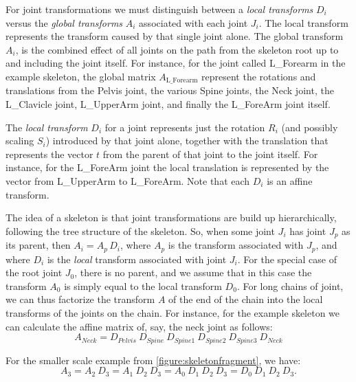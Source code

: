 For joint transformations we must distinguish between a \emph{local transforms} $D_i$ versus the \emph{global transforms} $A_i$
associated with each joint $J_i$.
The local transform represents the transform caused by that single joint alone.
The global transform $A_i$, is the combined effect of all joints
on the path from the skeleton root up to and including the joint itself.
For instance, for the joint called L\_Forearm in the example skeleton,
the global matrix $A_\text{L\_Forearm}$ represent the rotations and translations
from the Pelvis joint, the various Spine joints, the Neck joint, the
L\_Clavicle joint, L\_UpperArm joint, and finally the L\_ForeArm joint itself.

The \emph{local transform} $D_i$  for a joint represents just the rotation $R_i$ (and possibly scaling $S_i$)
introduced by that joint alone, together with the translation that represents the vector $t$ from the parent
of that joint to the joint itself.
For instance, for the L\_ForeArm joint the local translation is represented by the vector from L\_UpperArm to L\_ForeArm.
Note that each $D_i$ is an affine transform.


 The idea of a skeleton is that joint transformations are build up hierarchically, following the tree
 structure of the skeleton. So, when some joint $J_i$ has joint $J_p$ as its parent,
 then $A_i = A_p \, D_i$, where $A_p$ is the transform associated with $J_p$,
 and where $D_i$ is the \emph{local} transform associated with joint $J_i$.
 For the special case of the root joint $J_0$, there is no parent, and we assume that in this case the
 transform $A_0$ is simply equal to the local transform $D_0$.
 For long chains of joint, we can thus factorize the transform $A$ of the end of the chain into
 the local transforms of the joints on the chain. For instance, for the example skeleton
 we can calculate the affine matrix of, say, the neck joint as follows:
  \begin{equation}
  A_\textit{Neck} = D_\textit{Pelvis} \: D_\textit{Spine} \: D_\textit{Spine1} \: D_\textit{Spine2} \: D_\textit{Spine3} \:D_\textit{Neck}
  \end{equation}
%

For the smaller scale example from \autoref{figure:skeletonfragment}, we have:
%
\begin{equation}\label{eq:a3}
 A_3 = A_2\: D_3 = A_1 \: D_2\: D_3 = A_0\: D_1\:D_2\:D_3 = D_0\: D_1\:D_2\:D_3.
 \end{equation}
%
%


